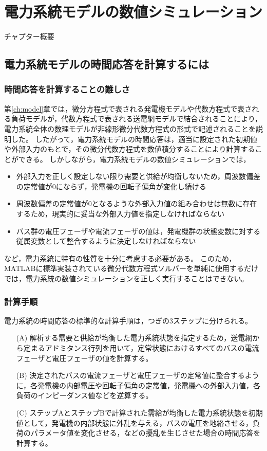 \documentclass[tombow,dvipdfmx]{corona-a5}
\begin{document}
\chapter{電力系統モデルの数値シミュレーション}

チャプター概要

\section{電力系統モデルの時間応答を計算するには}

\subsection{時間応答を計算することの難しさ}

第\ref{ch:model}章では，微分方程式で表される発電機モデルや代数方程式で表される負荷モデルが，代数方程式で表される送電網モデルで結合されることにより，電力系統全体の数理モデルが非線形微分代数方程式の形式で記述されることを説明した。
したがって，電力系統モデルの時間応答は，適当に設定された初期値や外部入力のもとで，その微分代数方程式を数値積分することにより計算することができる。
しかしながら，電力系統モデルの数値シミュレーションでは，
\begin{itemize}
\item 外部入力を正しく設定しない限り需要と供給が均衡しないため，周波数偏差の定常値が0にならず，発電機の回転子偏角が変化し続ける
\item 周波数偏差の定常値が0となるような外部入力値の組み合わせは無数に存在するため，現実的に妥当な外部入力値を指定しなければならない
\item バス群の電圧フェーザや電流フェーザの値は，発電機群の状態変数に対する従属変数として整合するように決定しなければならない
\end{itemize}
など，電力系統に特有の性質を十分に考慮する必要がある。
このため，MATLABに標準実装されている微分代数方程式ソルバーを単純に使用するだけでは，電力系統の数値シミュレーションを正しく実行することはできない。

\subsection{計算手順}\label{sec:numstep}

電力系統の時間応答の標準的な計算手順は，つぎの3ステップに分けられる。

\begin{itemize}
\item[(A)] 解析する需要と供給が均衡した電力系統状態を指定するため，送電網から定まるアドミタンス行列を用いて，定常状態におけるすべてのバスの電流フェーザと電圧フェーザの値を計算する。
\item[(B)] 決定されたバスの電流フェーザと電圧フェーザの定常値に整合するように，各発電機の内部電圧や回転子偏角の定常値，発電機への外部入力値，各負荷のインピーダンス値などを逆算する。
\item[(C)] ステップAとステップBで計算された需給が均衡した電力系統状態を初期値として，発電機の内部状態に外乱を与える，バスの電圧を地絡させる，負荷のパラメータ値を変化させる，などの擾乱を生じさせた場合の時間応答を計算する。
\end{itemize}
\end{document}
